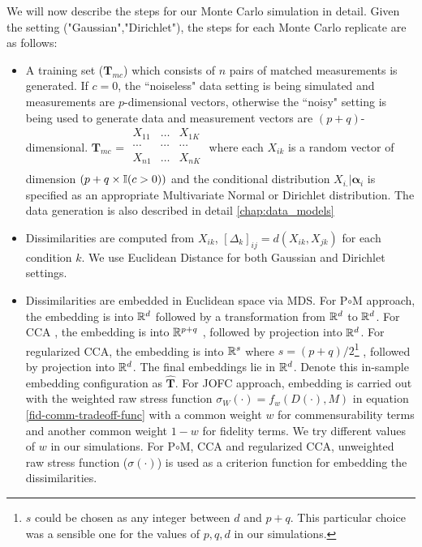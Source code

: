 \documentclass[12pt,oneside,final]{thesis}\usepackage[]{graphicx}\usepackage[]{color}
\begin{document}
We will now describe the steps for our Monte Carlo simulation in detail. Given the setting ("Gaussian","Dirichlet"),   the steps for each Monte Carlo replicate are as follows:
\begin{itemize}
\item A training set ($\mathbf{T}_{mc}$) which consists of  $n$ pairs of matched measurements is generated.  If $c=0$, the ``noiseless" data setting is being simulated and measurements are $p$-dimensional vectors, otherwise  the ``noisy" setting is being used to generate data and measurement vectors are $(p+q)$-dimensional. $ \mathbf{T}_{mc}$ = 
$\begin{array}{ccc}
        X_{11} & \ldots & X_{1K} \\
        \cdots & \cdots      & \cdots   \\ 
        X_{n1} & \ldots     & X_{nK} \\
    \end{array}
$
 where each $X_{ik}$ is a random vector of dimension $(p+q \times \mathbb{I} (c>0))$ and the conditional distribution  $X_{i.}|\bm{\alpha}_i  $ is specified as an appropriate Multivariate Normal or Dirichlet distribution. The data generation is also described in detail \autoref{chap:data_models}
\item  Dissimilarities are computed from $X_{ik}$, $\left[\Delta_{k}\right]_{ij}=d(X_{ik},X_{jk})$ for each condition $k$. We use Euclidean Distance for both Gaussian and Dirichlet settings.
\item Dissimilarities are embedded in  Euclidean space  via MDS. For P$\circ$M approach, the embedding is into $\mathbb{R}^d$ followed by a transformation from  $\mathbb{R}^d$ to  $\mathbb{R}^d$. For CCA , the embedding is into $\mathbb{R}^{p+q}$ , followed by projection into $\mathbb{R}^d$. For regularized CCA,  the embedding is into $\mathbb{R}^{s}$ where $s=(p+q)/2$\footnote{$s$ could be chosen as any integer between $d$ and $p+q$. This particular choice was a sensible one for the values of $p,q,d$ in our simulations.} , followed by projection into $\mathbb{R}^d$. The final embeddings lie in $\mathbb{R}^d$.   Denote this in-sample embedding configuration as   $\hat{\mathbf{T}}$. For JOFC approach, embedding is carried out with the weighted raw stress function $\sigma_{W}(\cdot)=f_{w}(D(\cdot),M)$ in equation \eqref{fid-comm-tradeoff-func} with a common weight $w$ for commensurability terms and another common weight $1-w$ for fidelity terms. We try different values of $w$ in our simulations. For P$\circ$M, CCA and regularized CCA, unweighted raw stress function ($\sigma(\cdot)$) is used as a criterion function for embedding the dissimilarities.


\end{itemize}
\end{document}
